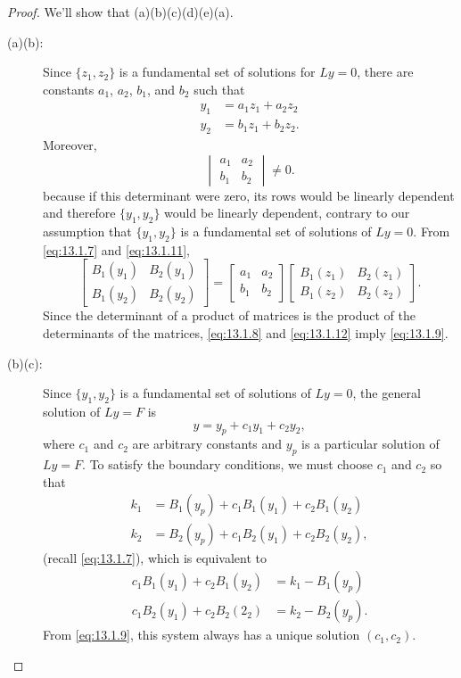 \begin{proof}
We'll show that (a)\textRightarrow(b)\textRightarrow(c)\textRightarrow(d)\textRightarrow(e)\textRightarrow(a).

\begin{description}
\item[(a)\textRightarrow(b):]
Since $\{z_{1},z_{2}\}$ is a fundamental set of solutions for $Ly=0$,
there are
constants
$a_{1}$, $a_{2}$, $b_{1}$, and $b_{2}$  such that
\begin{equation} \label{eq:13.1.11}
\begin{aligned}
y_{1} &=a_{1}z_{1}+a_{2}z_{2}\\
y_{2} &=b_{1}z_{1}+b_{2}z_{2}.
\end{aligned}
\end{equation}
Moreover,
\begin{equation} \label{eq:13.1.12}
\begin{vmatrix}
a_{1}&a_{2}\\b_{1}&b_{2}
\end{vmatrix}\ne0.
\end{equation}
because if this determinant were zero, its rows would be linearly
dependent and therefore
$\{y_{1},y_{2}\}$ would be linearly dependent, contrary to our assumption
that  $\{y_{1},y_{2}\}$  is a fundamental set of solutions of $Ly=0$.
From \eqref{eq:13.1.7} and \eqref{eq:13.1.11},
\[
\begin{bmatrix}
B_{1}(y_{1})&B_{2}(y_{1})\\B_{1}(y_{2})&B_{2}(y_{2})
\end{bmatrix}=
\begin{bmatrix}
a_{1}&a_{2}\\b_{1}&b_{2}
\end{bmatrix}
\begin{bmatrix}
B_{1}(z_{1})&B_{2}(z_{1})\\
B_{1}(z_{2})&B_{2}(z_{2})
\end{bmatrix}.
\]
Since the determinant of a product of matrices is the product of the
determinants of the matrices, \eqref{eq:13.1.8} and \eqref{eq:13.1.12} imply
\eqref{eq:13.1.9}.

\item[(b)\textRightarrow(c):]
Since $\{y_{1},y_{2}\}$ is a fundamental set of solutions of
$Ly=0$, the general solution of  $Ly=F$ is
\[
y=y_{p}+c_{1}y_{1}+c_{2}y_{2},
\]
where $c_{1}$ and $c_{2}$ are arbitrary constants and  $y_{p}$ is a
particular solution of
$Ly=F$. To satisfy the boundary conditions, we must choose $c_{1}$ and
$c_{2}$ so that
\begin{align*}
k_{1}&=B_{1}(y_{p})+c_{1}B_{1}(y_{1})+c_{2}B_{1}(y_{2})\\
k_{2}&=B_{2}(y_{p})+c_{1}B_{2}(y_{1})+c_{2}B_{2}(y_{2}),
\end{align*}
(recall \eqref{eq:13.1.7}), which is equivalent to
\[
\begin{aligned}
c_{1}B_{1}(y_{1})+c_{2}B_{1}(y_{2}) &= k_{1}-B_{1}(y_{p}) \\
c_{1}B_{2}(y_{1})+c_{2}B_{2}(2_{2}) &= k_{2}-B_{2}(y_{p}).
\end{aligned}
\]
From  \eqref{eq:13.1.9}, this system always has a  unique solution
 $(c_{1},c_{2})$.


\end{description}
\end{proof}
